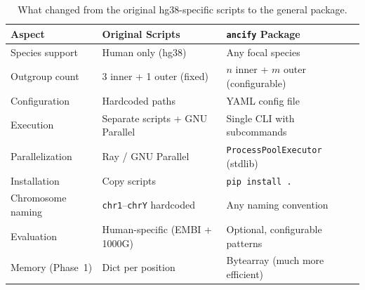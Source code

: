 \documentclass[11pt,a4paper]{article}
\begin{document}
\begin{table}[H]
\centering
\caption{What changed from the original hg38-specific scripts to the general package.}
\begin{tabular}{p{5cm}p{4cm}p{4.5cm}}
\toprule
\textbf{Aspect} & \textbf{Original Scripts} & \textbf{\texttt{ancify} Package} \\
\midrule
Species support & Human only (hg38) & Any focal species \\
Outgroup count & 3 inner + 1 outer (fixed) & $n$ inner + $m$ outer (configurable) \\
Configuration & Hardcoded paths & YAML config file \\
Execution & Separate scripts + GNU Parallel & Single CLI with subcommands \\
Parallelization & Ray / GNU Parallel & \texttt{ProcessPoolExecutor} (stdlib) \\
Installation & Copy scripts & \texttt{pip install .} \\
Chromosome naming & \texttt{chr1}--\texttt{chrY} hardcoded & Any naming convention \\
Evaluation & Human-specific (EMBI + 1000G) & Optional, configurable patterns \\
Memory (Phase~1) & Dict per position & Bytearray (much more efficient) \\
\bottomrule
\end{tabular}
\end{table}
\end{document}
